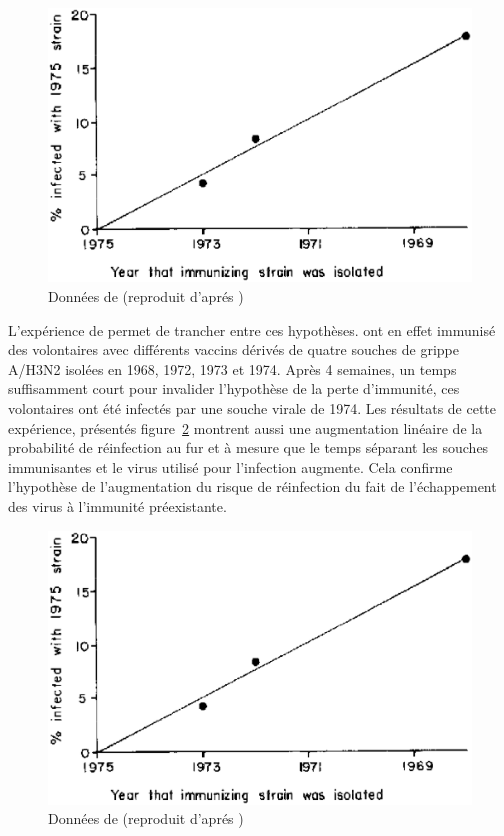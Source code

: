 \begin{figure}[!htbp]
  \begin{center}
    \includegraphics[width=0.5\linewidth]{graphs/intro/gill_murphy.eps}
  \end{center}
  \caption{Données de \citet{Gill1977} (reproduit d'aprés \citet{Pease1987})}
  \label{fig:intro:gill_murphy}
\end{figure}

L'expérience de \citet{Potter1977} permet de trancher entre ces
hypothèses. \citet{Potter1977} ont en effet immunisé des volontaires
avec différents vaccins dérivés de quatre souches de grippe A/H3N2
isolées en 1968, 1972, 1973 et 1974. Après 4 semaines, un temps
suffisamment court pour invalider l'hypothèse de la perte d'immunité,
ces volontaires ont été infectés par une souche virale de 1974. Les
résultats de cette expérience, présentés figure~\ref{fig:intro:potter}
montrent aussi une augmentation linéaire de la probabilité de
réinfection au fur et à mesure que le temps séparant les souches
immunisantes et le virus utilisé pour l'infection augmente. Cela
confirme l'hypothèse de l'augmentation du risque de réinfection du
fait de l'échappement des virus à l'immunité préexistante.

\begin{figure}[!htbp]
  \begin{center}
    \includegraphics[width=0.5\linewidth]{graphs/intro/gill_murphy.eps}
  \end{center}
  \caption{Données de \citet{Potter1977} (reproduit d'aprés
    \citet{Pease1987})}
  \label{fig:intro:potter}
\end{figure}


